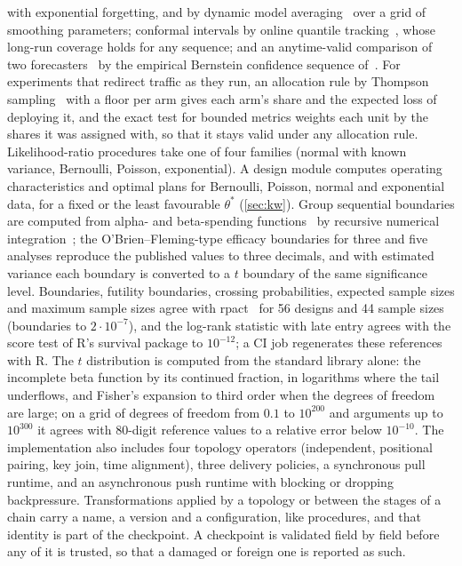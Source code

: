 \documentclass[11pt,a4paper]{article}
\theoremstyle{definition}
\theoremstyle{remark}
\begin{document}
with exponential forgetting, and by dynamic model
averaging~\cite{raftery2010} over a grid of smoothing parameters;
conformal intervals by online quantile
tracking~\cite{gibbs2021,angelopoulos2023}, whose long-run coverage holds
for any sequence; and an anytime-valid comparison of two
forecasters~\cite{choe2024} by the empirical Bernstein confidence
sequence of~\cite{howard2021}. For experiments that redirect traffic as they run, an
allocation rule by Thompson sampling~\cite{thompson1933} with a floor per
arm gives each arm's share and the expected loss of deploying it, and the
exact test for bounded metrics weights each unit by the shares it was
assigned with, so that it stays valid under any allocation rule. Likelihood-ratio procedures take one of four
families (normal with known variance, Bernoulli, Poisson, exponential).
A design module computes operating characteristics and optimal plans
for Bernoulli, Poisson, normal and exponential data, for a fixed or the
least favourable $\theta^*$ (\cref{sec:kw}). Group sequential
boundaries are computed from alpha- and beta-spending
functions~\cite{lan1983,jennison2000} by recursive numerical
integration~\cite{armitage1969}; the O'Brien--Fleming-type efficacy
boundaries for three and five analyses reproduce the published values to
three decimals, and with estimated variance each boundary is converted to
a $t$ boundary of the same significance level. Boundaries, futility
boundaries, crossing probabilities, expected sample sizes and maximum
sample sizes agree with rpact~\cite{rpact} for 56 designs and 44 sample
sizes (boundaries to $2\cdot10^{-7}$), and the log-rank statistic with
late entry agrees with the score test of R's survival package to
$10^{-12}$; a CI job regenerates these references with R. The $t$ distribution is
computed from the standard library alone: the incomplete beta function
by its continued fraction, in logarithms where the tail underflows, and
Fisher's expansion to third order when the degrees of freedom are
large; on a grid of degrees of freedom from $0.1$ to $10^{200}$ and
arguments up to $10^{300}$ it agrees with 80-digit reference values to
a relative error below $10^{-10}$. The
implementation also includes four topology operators (independent,
positional pairing, key join, time alignment), three delivery policies,
a synchronous pull runtime, and an asynchronous push runtime with
blocking or dropping backpressure. Transformations applied by a topology
or between the stages of a chain carry a name, a version and a
configuration, like procedures, and that identity is part of the
checkpoint. A checkpoint is validated field by field before any of it is
trusted, so that a damaged or foreign one is reported as such.
\end{document}
